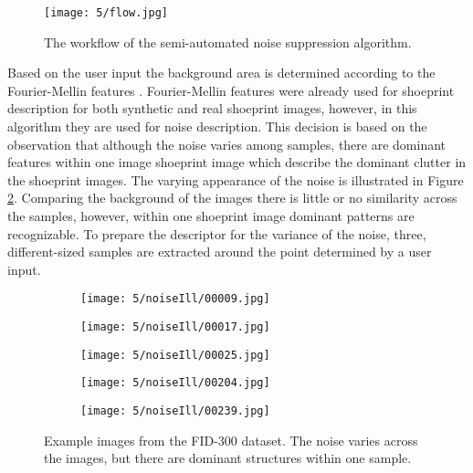 \documentclass[draft,final]{vutinfth} %
\begin{document}
\begin{figure}[h]
  \centering
  \texttt{[image: 5/flow.jpg]}
  \caption{The workflow of the semi-automated noise suppression algorithm.}
  \label{fig:sans:workflow} %
\end{figure}

\par
Based on the user input the background area is determined according to the Fourier-Mellin features \cite{sheng1986circular}.
Fourier-Mellin features were already used for shoeprint description for both synthetic \cite{gueham2008automatic} and real \cite{wu2019crime} shoeprint images, however, in this algorithm they are used for noise description.
This decision is based on the observation that although the noise varies among samples, there are dominant features within one image shoeprint image which describe the dominant clutter in the shoeprint images. 
The varying appearance of the noise is illustrated in Figure \ref{fig:sans:noiseIll}. Comparing the background of the images there is little or no similarity across the samples, however, within one shoeprint image dominant patterns are recognizable.
To prepare the descriptor for the variance of the noise, three, different-sized samples are extracted around the point determined by a user input.

\begin{figure}[h]
\centering
  \begin{subfigure}[t]{0.19\columnwidth}
    \centering
    \texttt{[image: 5/noiseIll/00009.jpg]}
  \end{subfigure}
  \begin{subfigure}[t]{0.19\columnwidth}
    \centering
    \texttt{[image: 5/noiseIll/00017.jpg]}
  \end{subfigure}
  \begin{subfigure}[t]{0.19\columnwidth}
    \centering
    \texttt{[image: 5/noiseIll/00025.jpg]}
  \end{subfigure}
  \begin{subfigure}[t]{0.19\columnwidth}
    \centering
    \texttt{[image: 5/noiseIll/00204.jpg]}
  \end{subfigure}
  \begin{subfigure}[t]{0.19\columnwidth}
    \centering
    \texttt{[image: 5/noiseIll/00239.jpg]}
  \end{subfigure}
\caption{Example images from the FID-300 dataset. The noise varies across the images, but there are dominant structures within one sample.}
\label{fig:sans:noiseIll}

\end{figure}
\end{document}
